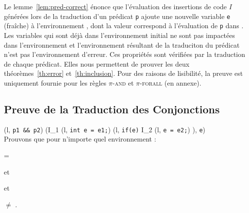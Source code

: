 Le lemme~\ref{lem:pred-correct} énonce que l'évaluation des insertions de code
$I$ générées lors de la traduction d'un prédicat \lstinline'p' ajoute une
nouvelle variable \lstinline'e' (fraîche) à l'environnement \env, dont la valeur
correspond à l'évaluation de \lstinline'p' dans \env.
Les variables qui sont déjà dans l'environnement initial \env ne sont pas
impactées dans l'environnement  et l'environnement résultant de
la traduciton du prédicat n'est pas l'environnement d'erreur.
Ces propriétés sont vérifiées par la traduction de chaque prédicat.
Elles nous permettent de prouver les deux théorèmes~\ref{th:error}
et~\ref{th:inclusion}.
Pour des raisons de lisibilité, la preuve est uniquement fournie pour les règles
\textsc{$\pi$-and} et \textsc{$\pi$-forall} (en annexe).


\subsection{Preuve de la Traduction des Conjonctions}

{
  { (l, \mbox{\lstinline'p1 && p2'}) 
    (I_1 \cdot (l, \mbox{\lstinline'int e = e1;'}) \cdot
    (l, \mbox{\lstinline'if(e)'} \bopen I_2 \cdot
    (l, \mbox{\lstinline'e = e2;'}) \bclose ),
    \mbox{\lstinline'e'})
  }
}~\\

Prouvons que pour n'importe quel environnement \env :

 = 

et

\env \subenv
{}

et

 $\neq$ \errorenv.


